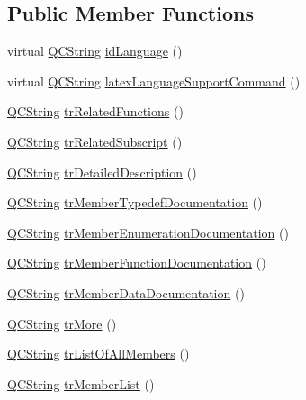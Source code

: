 \subsection*{Public Member Functions}
\begin{DoxyCompactItemize}
\item 
virtual \mbox{\hyperlink{class_q_c_string}{Q\+C\+String}} \mbox{\hyperlink{class_translator_italian_a03fa97515ddfa1510cafc3a6070bd798}{id\+Language}} ()
\item 
virtual \mbox{\hyperlink{class_q_c_string}{Q\+C\+String}} \mbox{\hyperlink{class_translator_italian_a627c83ff76fb011b240d99de017dd2c7}{latex\+Language\+Support\+Command}} ()
\item 
\mbox{\hyperlink{class_q_c_string}{Q\+C\+String}} \mbox{\hyperlink{class_translator_italian_ad87f9c040ad9cd778a70fbf929002f6c}{tr\+Related\+Functions}} ()
\item 
\mbox{\hyperlink{class_q_c_string}{Q\+C\+String}} \mbox{\hyperlink{class_translator_italian_a5c4d31a12192bcf85b45ea492e3777d8}{tr\+Related\+Subscript}} ()
\item 
\mbox{\hyperlink{class_q_c_string}{Q\+C\+String}} \mbox{\hyperlink{class_translator_italian_a1b1fe2622428c4613dab5aa77624ff95}{tr\+Detailed\+Description}} ()
\item 
\mbox{\hyperlink{class_q_c_string}{Q\+C\+String}} \mbox{\hyperlink{class_translator_italian_ac65ce719d3575b96d0eb2165689dd4fd}{tr\+Member\+Typedef\+Documentation}} ()
\item 
\mbox{\hyperlink{class_q_c_string}{Q\+C\+String}} \mbox{\hyperlink{class_translator_italian_a3063e66759faae2f04fe8fe8a8790942}{tr\+Member\+Enumeration\+Documentation}} ()
\item 
\mbox{\hyperlink{class_q_c_string}{Q\+C\+String}} \mbox{\hyperlink{class_translator_italian_ac61a2916232c9c2350aee95d20f0f368}{tr\+Member\+Function\+Documentation}} ()
\item 
\mbox{\hyperlink{class_q_c_string}{Q\+C\+String}} \mbox{\hyperlink{class_translator_italian_a4afcca626ade00f54d0d799937be8354}{tr\+Member\+Data\+Documentation}} ()
\item 
\mbox{\hyperlink{class_q_c_string}{Q\+C\+String}} \mbox{\hyperlink{class_translator_italian_a4aea4630e1a34c3df9e8d586662ae018}{tr\+More}} ()
\item 
\mbox{\hyperlink{class_q_c_string}{Q\+C\+String}} \mbox{\hyperlink{class_translator_italian_a94c13af529cf8a66183315fbaf35858d}{tr\+List\+Of\+All\+Members}} ()
\item 
\mbox{\hyperlink{class_q_c_string}{Q\+C\+String}} \mbox{\hyperlink{class_translator_italian_a8c341d470dbb7dc4264e21067249952b}{tr\+Member\+List}} ()

\end{DoxyCompactItemize}
